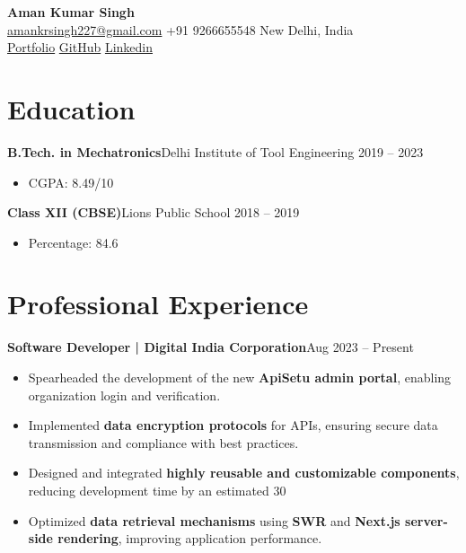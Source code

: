 \documentclass[a4paper,10pt]{article}
\newcommand{\entry}[2]{\textbf{#1}\hfill #2}
\begin{document}
\begin{center}
    {\LARGE \textbf{Aman Kumar Singh}} \\
    \vspace{4pt}
    \href{mailto:amankrsingh227@gmail.com}{amankrsingh227@gmail.com} \textbullet{}
    +91 9266655548 \textbullet{} New Delhi, India \\
    \vspace{4pt}
    \href{https://amankrsingh.vercel.app/}{Portfolio} \textbullet{}
    \href{https://github.com/amanrathore48}{GitHub} \textbullet{}
    \href{https://linkedin.com/in/aman-kr-singh}{Linkedin}
\end{center}

\section*{Education}
\entry{B.Tech. in Mechatronics}{Delhi Institute of Tool Engineering \textbullet{} 2019 -- 2023}
\begin{itemize}[leftmargin=0.5cm]
    \item CGPA: 8.49/10
\end{itemize}

\entry{Class XII (CBSE)}{Lions Public School \textbullet{} 2018 -- 2019}
\begin{itemize}[leftmargin=0.5cm]
    \item Percentage: 84.6%
\end{itemize}
\vspace{2pt}

\section*{Professional Experience}
\entry{Software Developer | Digital India Corporation}{Aug 2023 -- Present}
\begin{itemize}[leftmargin=0.5cm]
    \item Spearheaded the development of the new \textbf{ApiSetu admin portal}, enabling organization login and verification.
    \item Implemented \textbf{data encryption protocols} for APIs, ensuring secure data transmission and compliance with best practices.
    \item Designed and integrated \textbf{highly reusable and customizable components}, reducing development time by an estimated 30%
    \item Optimized \textbf{data retrieval mechanisms} using \textbf{SWR} and \textbf{Next.js server-side rendering}, improving application performance.
\end{itemize}
\end{document}
